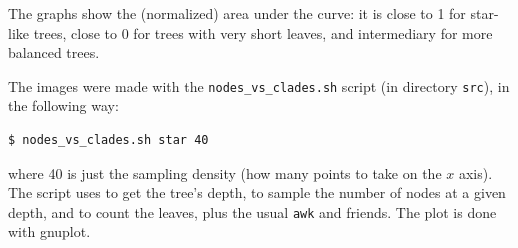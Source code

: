 The graphs show the (normalized) area under the curve: it is close to 1 for star-like trees, close to 0 for trees with very short leaves, and intermediary for more balanced trees.

The images were made with the \texttt{nodes\_vs\_clades.sh} script (in
directory \texttt{src}), in the following way:
\begin{verbatim}
$ nodes_vs_clades.sh star 40
\end{verbatim}
where 40 is just the sampling density (how many points to take on the $x$
axis). The script uses \distance{} to get the tree's depth, \ed{} to sample the number of nodes at a given depth, and \nwindent{} to count the leaves, plus the usual \texttt{awk} and friends. The plot is done with gnuplot.
